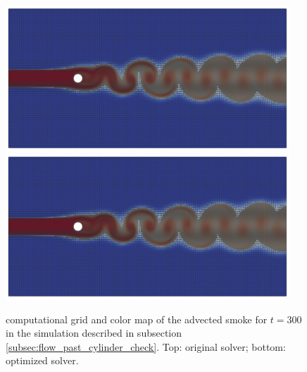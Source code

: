 \documentclass[11pt, a4paper]{article}
\theoremstyle{remark}
\begin{document}
\begin{figure}
  \centering
  \includegraphics[width=0.95\textwidth]{./figures/flow_past_cylinder/check_unchanged_behavior/original_grid_and_smoke_t_is_300.pdf} \\
  \includegraphics[width=0.95\textwidth]{./figures/flow_past_cylinder/check_unchanged_behavior/optimized_grid_and_smoke_t_is_300.pdf}
 \caption{\label{fig:grid_and_smoke_flow_past_cylinder_check_unchanged} computational grid and color map of the advected smoke for $t = 300$ in the simulation described in subsection \ref{subsec:flow_past_cylinder_check}. Top: original solver; bottom: optimized solver.}
\end{figure}
\end{document}
